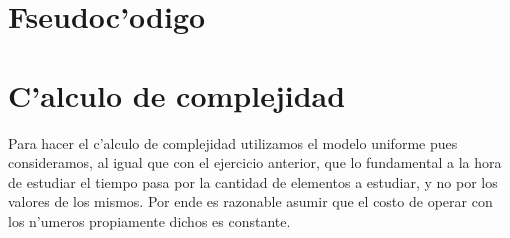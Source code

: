 \section{Fseudoc'odigo}


\section{C'alculo de complejidad}
Para hacer el c'alculo de complejidad utilizamos el modelo uniforme pues consideramos, al igual que con 
el ejercicio anterior, que lo fundamental a la hora de estudiar el tiempo pasa por la cantidad de elementos 
a estudiar, y no por los valores de los mismos. Por ende es razonable asumir que el costo de operar
con los n'umeros propiamente dichos es constante.\\

